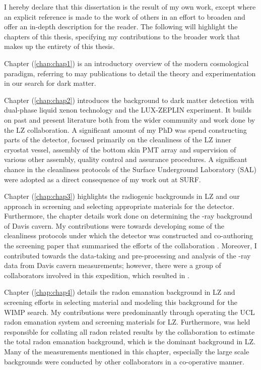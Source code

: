 \begin{declaration}
I hereby declare that this dissertation is the result of my own work, except where an explicit reference is made to the work of others in an effort to broaden and offer an in-depth description for the reader. The following will highlight the chapters of this thesis, specifying my contributions to the broader work that makes up the entirety of this thesis.
  
Chapter (\ref{chap:chap1}) is an introductory overview of the modern cosmological paradigm, referring to may publications to detail the theory and experimentation in our search for dark matter. 
  
Chapter (\ref{chap:chap2}) introduces the background to dark matter detection with dual-phase liquid xenon technology and the LUX-ZEPLIN experiment. It builds on past and present literature both from the wider community and work done by the LZ collaboration. A significant amount of my PhD was spend constructing parts of the detector, focused primarily on the cleanliness of the LZ inner cryostat vessel, assembly of the bottom skin PMT array and supervision of various other assembly, quality control and assurance procedures. A significant chance in the cleanliness protocols of the Surface Underground Laboratory (SAL) were adopted as a direct consequence of my work out at SURF.
  
Chapter (\ref{chap:chap3}) highlights the radiogenic backgrounds in LZ and our approach in screening and selecting appropriate materials for the detector. Furthermore, the chapter details work done on determining the \gamma{}-ray background of Davis cavern. My contributions were towards developing some of the cleanliness protocols under which the detector was constructed and co-authoring the screening paper that summarised the efforts of the collaboration \cite{lz_screening}. Moreover, I contributed towards the data-taking and pre-processing and analysis of the \gamma{}-ray data from Davis cavern measurements; however, there were a group of collaborators involved in this expedition, which resulted in \cite{Akerib_2020_gray_measurements}.
  
Chapter (\ref{chap:chap4}) details the radon emanation background in LZ and screening efforts in selecting material and modeling this background for the WIMP search. My contributions were predominantly through operating the UCL radon emanation system and screening materials for LZ. Furthermore, was held responsible for collating all radon related results by the collaboration to estimate the total radon emanation background, which is the dominant background in LZ. Many of the measurements mentioned in this chapter, especially the large scale backgrounds were conducted by other collaborators in a co-operative manner. 
  

\end{declaration}
